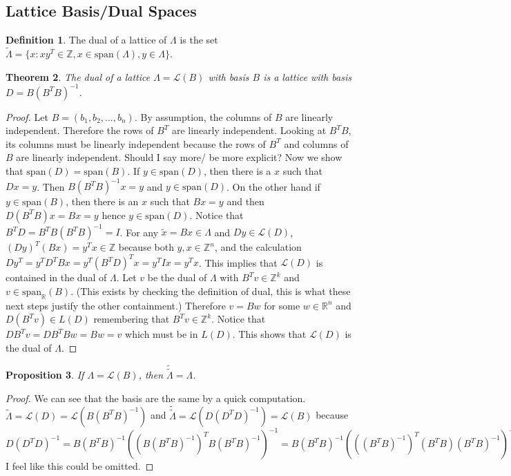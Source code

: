 \documentclass{article}
\newcommand{\Z}[0]{\mathbb{Z}}		%
\newcommand{\R}[0]{\mathbb{R}}		%
\newcommand{\La}[0]{\mathcal L}
\newtheorem{thm}{Theorem}[section]
\newtheorem{prop}[thm]{Proposition}
\theoremstyle{definition}
\newtheorem{defn}[thm]{Definition}
\theoremstyle{remark}
\begin{document}
\subsection{Lattice Basis/Dual Spaces}
\begin{defn} \cite{coursenotes}
 The dual of a lattice of $\Lambda$ is the set $\tilde \Lambda = \{x: xy^T \in \Z, x\in \text{span}(\Lambda), y\in \Lambda \}$.
\end{defn}
\begin{thm}\label{DualLattice}
The dual of a lattice $\Lambda = \mathcal{L}(B)$ with basis $B$ is a lattice with basis $D = B(B^TB)^{-1}$. 
\end{thm}
\begin{proof}
Let $B= (b_1,b_2,...,b_n)$. By assumption, the columns of $B$ are linearly independent. Therefore the rows of $B^T$ are linearly independent. Looking at $B^TB$, its columns must be linearly independent because the rows of $B^T$ and columns of $B$ are linearly independent. 
{\color{red} Should I say more/ be more explicit?} 
Now we show that $\text{span}(D) = \text{span}(B)$. If $y\in \text{span}(D)$, then there is a $x$ such that $Dx =y$. Then $B(B^TB)^{-1}x = y$ and $y\in \text{span}(D)$. On the other hand if $y\in \text{span}(B)$, then there is an $x$ such that $Bx = y$ and then $D(B^TB)x = Bx = y$ hence $y\in \text{span}(D)$. 
Notice that $B^T D = B^T B(B^TB)^{-1} = I$. For any $\tilde{x} = Bx \in \Lambda $ and $ Dy \in \La(D) $, $(Dy)^T(Bx) = y^Tx \in \Z$ because both $y,x \in \Z^n$, and the calculation $Dy^T = y^TD^TBx = y^T(B^TD)^Tx = y^T I x = y^Tx$. This implies that $\La(D)$ is contained in the dual of $\Lambda$. Let $v$ be the dual of $\Lambda$ with $B^Tv\in \Z^k$ and $v\in \text{span}_\R(B)$. (This exists by checking the definition of dual, this is what these next steps justify the other containment.) Therefore $v = Bw$ for some $w\in \R^n$ and $D(B^Tv) \in L(D)$ remembering that $B^Tv \in \Z^k$. Notice that $DB^Tv =DB^TBw = Bw = v $ which must be in $L(D)$. This shows that $\La(D)$ is the dual of $\Lambda$.
\end{proof}
\begin{prop}
If $\Lambda = \La(B)$, then $\tilde{\tilde{\Lambda}} = \Lambda$. 
\end{prop}
\begin{proof}
We can see that the basis are the same by a quick computation. $\tilde{\Lambda} = \La(D) = \La(B(B^TB)^{-1})$ and $\tilde{\tilde{\Lambda}} = \La( D(D^TD)^{-1}) = \La(B)$ because $D(D^TD)^{-1} = B(B^TB)^{-1} ((B(B^TB)^{-1})^TB(B^TB)^{-1})^{-1} =B(B^TB)^{-1} (((B^TB)^{-1})^T(B^TB)(B^TB)^{-1})^{-1}= B(B^TB)^{-1} (((B^TB)^{-1})^T)^{-1} = B.$
{\color{red} I feel like this could be omitted.}
\end{proof}
\end{document}
